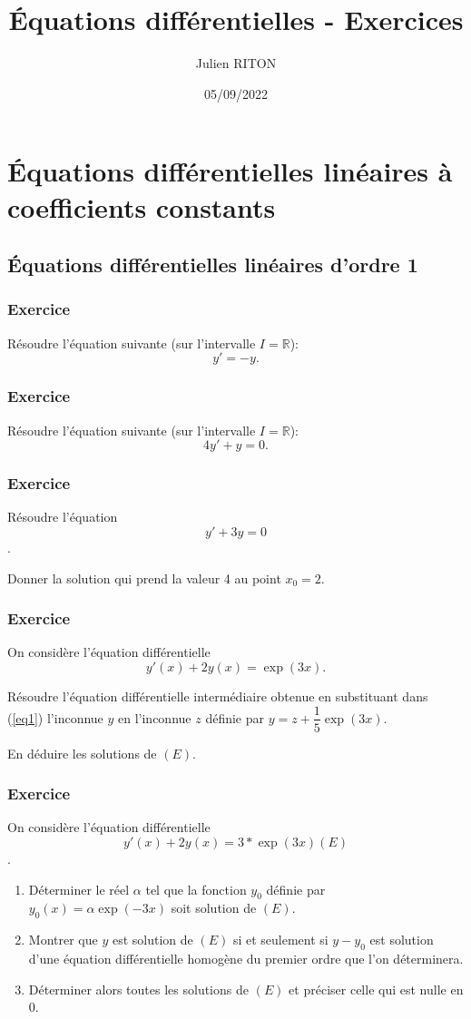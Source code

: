 \documentclass[10pt,a4paper]{article}
\author{Julien RITON}
\title{Équations différentielles - Exercices}
\date{05/09/2022}
\begin{document}
\maketitle

\section{Équations différentielles linéaires à coefficients constants}

\subsection{Équations différentielles linéaires d'ordre 1}
\subsubsection{Exercice}
Résoudre l'équation suivante (sur l'intervalle $I=\mathbb{R}$):
$$y'=-y.$$

\subsubsection{Exercice}
Résoudre l'équation suivante (sur l'intervalle $I=\mathbb{R}$):
$$4y'+y=0.$$

\subsubsection{Exercice}
Résoudre l'équation $$y'+3y=0$$.

Donner la solution qui prend la valeur 4 au point $x_0=2$.

\subsubsection{Exercice}
On considère l'équation différentielle 
\begin{equation}\label{eq1}
y'(x)+2y(x)=\exp(3x).
\end{equation}

Résoudre l'équation différentielle intermédiaire obtenue en substituant dans (\ref{eq1}) l'inconnue $y$ en l'inconnue $z$ définie par $y=z+\dfrac{1}{5}\exp(3x)$.

En déduire les solutions de $\left(E\right)$.

\subsubsection{Exercice}
On considère l'équation différentielle $$y'(x)+2y(x)=3*\exp(3x) \left(E\right)$$.
\begin{enumerate}
\item
Déterminer le réel $\alpha$ tel que la fonction $y_0$ définie par $y_0(x)=\alpha\exp(-3x)$
soit solution de $(E)$.
\item
Montrer que $y$ est solution de $(E)$ si et seulement si $y-y_0$ est solution d'une équation différentielle homogène du premier ordre que l'on déterminera.
\item
Déterminer alors toutes les solutions de $(E)$ et préciser celle qui est nulle en $0$.
\end{enumerate}
\end{document}
